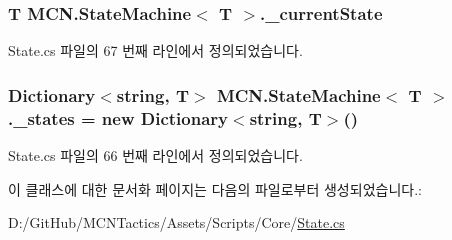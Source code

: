 \subsubsection[{\texorpdfstring{\+\_\+current\+State}{_currentState}}]{\setlength{\rightskip}{0pt plus 5cm}T {\bf M\+C\+N.\+State\+Machine}$<$ T $>$.\+\_\+current\+State\hspace{0.3cm}{\ttfamily [private]}}\hypertarget{class_m_c_n_1_1_state_machine_a040bf7c13d5127fe983af2ef0a6315ec}{}\label{class_m_c_n_1_1_state_machine_a040bf7c13d5127fe983af2ef0a6315ec}


State.\+cs 파일의 67 번째 라인에서 정의되었습니다.

\subsubsection[{\texorpdfstring{\+\_\+states}{_states}}]{\setlength{\rightskip}{0pt plus 5cm}Dictionary$<$string, T$>$ {\bf M\+C\+N.\+State\+Machine}$<$ T $>$.\+\_\+states = new Dictionary$<$string, T$>$()\hspace{0.3cm}{\ttfamily [private]}}\hypertarget{class_m_c_n_1_1_state_machine_adf0f1417aacb073306b88563e7b3d740}{}\label{class_m_c_n_1_1_state_machine_adf0f1417aacb073306b88563e7b3d740}


State.\+cs 파일의 66 번째 라인에서 정의되었습니다.



이 클래스에 대한 문서화 페이지는 다음의 파일로부터 생성되었습니다.\+:\begin{DoxyCompactItemize}
\item 
D\+:/\+Git\+Hub/\+M\+C\+N\+Tactics/\+Assets/\+Scripts/\+Core/\hyperlink{_state_8cs}{State.\+cs}\end{DoxyCompactItemize}
